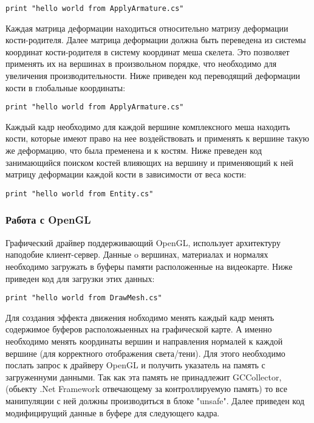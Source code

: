 \begin{lstlisting}
print "hello world from ApplyArmature.cs"
\end{lstlisting}

Каждая матрица деформации находиться относительно матризу деформации кости-родителя. Далее матрица деформации должна быть переведена из системы координат кости-родителя в систему координат меша скелета. Это позволяет применять их на вершинах в произвольном порядке, что необходимо для увеличения производительности. Ниже приведен код переводящий деформации кости в глобальные координаты:

\begin{lstlisting}
print "hello world from ApplyArmature.cs"
\end{lstlisting}


Каждый кадр необходимо для каждой вершине комплексного меша находить кости, которые имеют право на нее воздействовать и применять к вершине такую же деформацию, что была пременена и к костям. Ниже преведен код занимающийся поиском костей влияющих на вершину и применяющий к ней матрицу деформации каждой кости в зависимости от веса кости:

\begin{lstlisting}
print "hello world from Entity.cs"
\end{lstlisting}


\subsubsection{Работа с OpenGL}

Графический драйвер поддерживающий OpenGL, использует архитектуру наподобие клиент-сервер. Данные o вершинах, материалах и нормалях необходимо загружать в буферы памяти расположенные на видеокарте. Ниже приведен код для загрузки этих данных:

\begin{lstlisting}
print "hello world from DrawMesh.cs"
\end{lstlisting}

Для создания эффекта движения нобходимо менять каждый кадр менять содержимое буферов расположыенных на графической карте. А именно необходимо менять координаты вершин и направления нормалей к каждой вершине (для корректного отображения света/тени). Для этого необходимо послать запрос к драйверу OpenGL и получить указатель на память с загруженнуми данными. Так как эта память не принадлежит GCCollector, (обьекту .Net Framework отвечающему за контроллируемую память) то все манипуляции с ней должны производиться в блоке "unsafe". Далее приведен код модифицирущий данные в буфере для следующего кадра.

